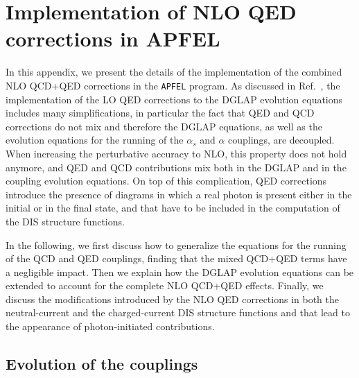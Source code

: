 \appendix
\section{Implementation of NLO QED corrections in APFEL}
\label{sec:appendixAPFEL}

In this appendix, we present the details of the implementation of the
combined NLO QCD+QED corrections in the {\tt APFEL} program.
%
As discussed in Ref.~\cite{Bertone:2013vaa}, the implementation of the
LO QED corrections to the DGLAP evolution equations includes many
simplifications, in particular the fact that QED and QCD corrections
do not mix and therefore the DGLAP equations, as well as the evolution
equations for the running of the $\alpha_s$ and $\alpha$ couplings,
are decoupled.
%
When increasing the perturbative accuracy to NLO,
this property does not hold anymore, and QED and QCD
contributions mix both in the DGLAP and in the coupling evolution
equations.
%
On top of this complication, QED corrections introduce the presence of
diagrams in which a real photon is present either in the initial or in
the final state, and that have to be included in the computation of the
DIS structure functions.

In the following, we first discuss how to generalize the equations for
the running of the QCD and QED couplings, finding that the mixed
QCD+QED terms have a negligible impact.
%
Then we explain how the DGLAP evolution equations can be extended
to account for the complete NLO QCD+QED effects.
%
Finally, we discuss the modifications introduced by the NLO QED
corrections in both the neutral-current and the charged-current DIS
structure functions and that lead to the appearance of photon-initiated
contributions.

\subsection{Evolution of the couplings}


